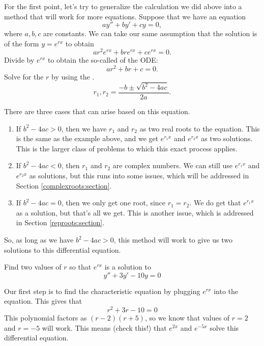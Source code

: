For the first point, let's try to generalize the calculation we did above into a method that will work for more equations. Suppose that we have an equation
\begin{equation} \label{ccsol:eq}
a y'' + b y' + c y = 0 ,
\end{equation}
where $a, b, c$ are constants. We can take our same assumption that the solution is of the form $y = e^{rx}$ to obtain
\begin{equation*}
a r^2 e^{rx} + 
b r e^{rx} + 
c e^{rx} = 0 .
\end{equation*}
Divide by $e^{rx}$ to obtain the so-called
\emph{} of the ODE:
\begin{equation*}
a r^2 + 
b r + 
c = 0 .
\end{equation*}
Solve for the $r$ by using the .
\begin{equation*}
r_1, r_2 = \frac{-b \pm \sqrt{b^2 - 4ac}}{2a} .
\end{equation*}

There are three cases that can arise based on this equation.
\begin{enumerate}[(1)]
\item If $b^2 - 4ac > 0$, then we have $r_1$ and $r_2$ as two real roots to the equation. This is the same as the example above, and we get $e^{r_1x}$ and $e^{r_2x}$ as two solutions. This is the larger class of problems to which this exact process applies.
\item If $b^2 - 4ac < 0$, then $r_1$ and $r_2$ are complex numbers. We can still use $e^{r_1x}$ and $e^{r_2x}$ as solutions, but this runs into some issues, which will be addressed in Section \ref{complexroots:section}.
\item If $b^2 - 4ac = 0$, then we only get one root, since $r_1 = r_2$. We do get that $e^{r_1x}$ as a solution, but that's all we get. This is another issue, which is addressed in Section \ref{reproots:section}.
\end{enumerate}

So, as long as we have $b^2 - 4ac > 0$, this method will work to give us two solutions to this differential equation.

\begin{example}
Find two values of $r$ so that $e^{rx}$ is a solution to 
\begin{equation*}
y'' + 3y' - 10y = 0
\end{equation*}

Our first step is to find the characteristic equation by plugging $e^{rx}$ into the equation. This gives that
\begin{equation*}
r^2 + 3r - 10 = 0
\end{equation*}
This polynomial factors as $(r-2)(r+5)$, so we know that values of $r=2$ and $r=-5$ will work. This means (check this!) that $e^{2x}$ and $e^{-5x}$ solve this differential equation.
\end{example}

